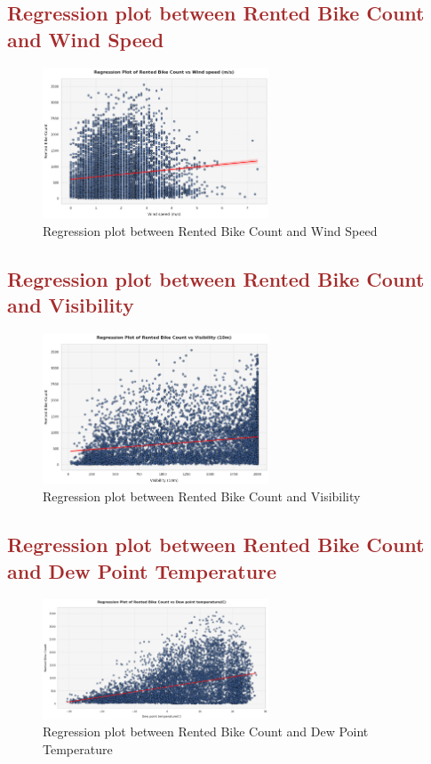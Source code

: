 \documentclass[12pt, letterpaper]{article}
\begin{document}
\subsection*{\textcolor{brown}{Regression plot between Rented Bike Count and Wind Speed}}

\begin{figure}[h]
  \centering
  \includegraphics[width=0.6\textwidth]{regression3.png}
  \caption{Regression plot between Rented Bike Count and Wind Speed}
\end{figure}

\subsection*{\textcolor{brown}{Regression plot between Rented Bike Count and Visibility}}

\begin{figure}[h]
  \centering
  \includegraphics[width=0.6\textwidth]{regression4.png}
  \caption{Regression plot between Rented Bike Count and Visibility}
\end{figure}

\newpage

\subsection*{\textcolor{brown}{Regression plot between Rented Bike Count and Dew Point Temperature}}

\begin{figure}[h]
  \centering
  \includegraphics[width=0.6\textwidth]{regression5.png}
  \caption{Regression plot between Rented Bike Count and Dew Point Temperature}
\end{figure}
\end{document}
